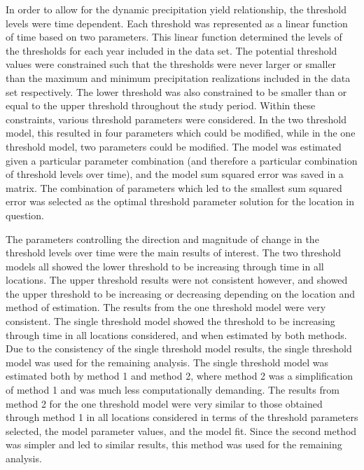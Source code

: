 In order to allow for the dynamic precipitation yield relationship, the threshold levels were time dependent. Each threshold was represented as a linear function of time based on two parameters. This linear function determined the levels of the thresholds for each year included in the data set. The potential threshold values were constrained such that the thresholds were never larger or smaller than the maximum and minimum precipitation realizations included in the data set respectively. The lower threshold was also constrained to be smaller than or equal to the upper threshold throughout the study period. Within these constraints, various threshold parameters were considered. In the two threshold model, this resulted in four parameters which could be modified, while in the one threshold model, two parameters could be modified. The model was estimated given a particular parameter combination (and therefore a particular combination of threshold levels over time), and the model sum squared error was saved in a matrix. The combination of parameters which led to the smallest sum squared error was selected as the optimal threshold parameter solution for the location in question. 

The parameters controlling the direction and magnitude of change in the threshold levels over time were the main results of interest. The two threshold models all showed the lower threshold to be increasing through time in all locations. The upper threshold results were not consistent however, and showed the upper threshold to be increasing or decreasing depending on the location and method of estimation. The results from the one threshold model were very consistent. The single threshold model showed the threshold to be increasing through time in all locations considered, and when estimated by both methods. Due to the consistency of the single threshold model results, the single threshold model was used for the remaining analysis. The single threshold model was estimated both by method 1 and method 2, where method 2 was a simplification of method 1 and was much less computationally demanding. The results from method 2 for the one threshold model were very similar to those obtained through method 1 in all locations considered in terms of the threshold parameters selected, the model parameter values, and the model fit. Since the second method was simpler and led to similar results, this method was used for the remaining analysis.

